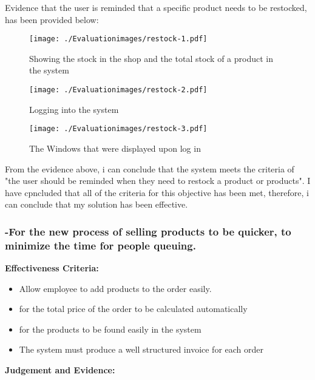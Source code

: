 Evidence that the user is reminded that a specific product needs to be restocked, has been provided below:

\begin{figure}[H]
\caption{Showing the stock in the shop and the total stock of a product in the system}
\hfill\texttt{[image: ./Evaluationimages/restock-1.pdf]}
\end{figure}

\begin{figure}[H]
\caption{Logging into the system}
\hfill\texttt{[image: ./Evaluationimages/restock-2.pdf]}
\end{figure}

\begin{figure}[H]
\caption{The Windows that were displayed upon log in}
\hfill\texttt{[image: ./Evaluationimages/restock-3.pdf]}
\end{figure}

From the evidence above, i can conclude that the system meets the criteria of "the user should be reminded when they need to restock a product or products". I have cpncluded that all of the criteria for this objective has been met, therefore, i can conclude that my solution has been effective.










\pagebreak
\subsubsection{-For the new process of selling products to be quicker, to minimize the time for people queuing.}

\textbf{Effectiveness Criteria:}\newline
\begin{itemize}
	\item{Allow employee to add products to the order easily.}
	\item{for the total price of the order to be calculated automatically}
	\item{for the products to be found easily in the system}
	\item{The system must produce a well structured invoice for each order}
\end{itemize}

\textbf{Judgement and Evidence:} \newline

